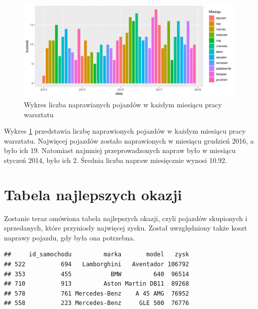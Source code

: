 \documentclass{article}\usepackage[]{graphicx}\usepackage[]{xcolor}
\makeatletter
\def\maxwidth{ %
  \ifdim\Gin@nat@width>\linewidth
    \linewidth
  \else
    \Gin@nat@width
  \fi
}
\newenvironment{kframe}{%
 \def\at@end@of@kframe{}%
 \ifinner\ifhmode%
  \def\at@end@of@kframe{\end{minipage}}%
  \begin{minipage}{\columnwidth}%
 \fi\fi%
 \def\FrameCommand##1{\hskip\@totalleftmargin \hskip-\fboxsep
 \colorbox{shadecolor}{##1}\hskip-\fboxsep
     \hskip-\linewidth \hskip-\@totalleftmargin \hskip\columnwidth}%
 \MakeFramed {\advance\hsize-\width
   \@totalleftmargin\z@ \linewidth\hsize
   \@setminipage}}%
 {\par\unskip\endMakeFramed%
 \at@end@of@kframe}
\newenvironment{knitrout}{}{} %
\makeatother
\begin{document}
\begin{knitrout}
\color{fgcolor}\begin{figure}[H]

{\centering \includegraphics[width=\maxwidth]{figure/fig_naprawy_miesiecznie-1} 

}

\caption[Wykres liczba naprawianych pojazdów w każdym miesiącu pracy warsztatu]{Wykres liczba naprawianych pojazdów w każdym miesiącu pracy warsztatu}\label{fig:fig_naprawy_miesiecznie}
\end{figure}

\end{knitrout}

Wykres \ref{fig:fig_naprawy_miesiecznie} przedstawia liczbę naprawionych pojazdów w każdym miesiącu pracy warsztatu. Najwięcej pojazdów zostało naprawionych w miesiącu 
grudzień 2016,
a było ich 19. Natomiast najmniej przeprowadzonych napraw było w miesiącu
styczeń 2014,
było ich 2. Średnia liczba napraw miesięcznie wynosi 
10.92. 

\section{Tabela najlepszych okazji}

Zostanie teraz omówiona tabela najlepszych okazji, czyli pojazdów skupionych i sprzedanych, które przyniosły najwięcej zysku. Został uwzględniony także koszt naprawy pojazdu, gdy była ona potrzebna.





\begin{knitrout}
\color{fgcolor}\begin{kframe}
\begin{verbatim}
##     id_samochodu         marka       model   zysk
## 522          694   Lamborghini   Aventador 106792
## 353          455           BMW         640  96514
## 710          913         Aston Martin DB11  89268
## 578          761 Mercedes-Benz    A 45 AMG  76952
## 558          223 Mercedes-Benz     GLE 500  76776
\end{verbatim}
\end{kframe}
\end{knitrout}
\end{document}
